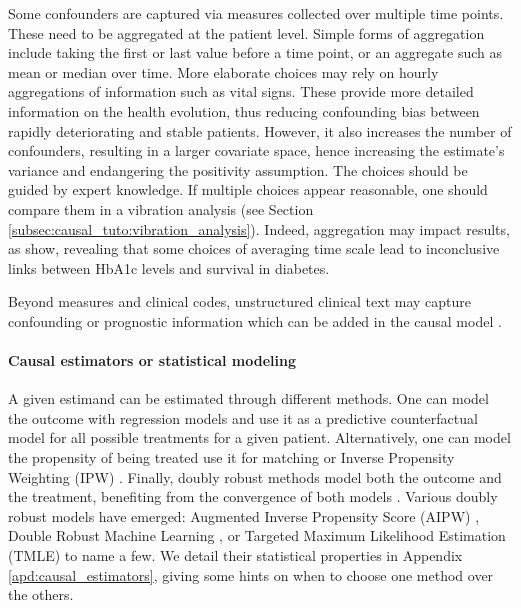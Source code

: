 \documentclass[french,12pt,twoside,a4paper]{book}
\begin{document}
Some confounders are captured via measures collected over multiple time points.
These need to be aggregated at the patient level. Simple forms of aggregation
include taking the first or last value before a time point, or an aggregate such
as mean or median over time. More elaborate choices may rely on hourly
aggregations of information such as vital signs. These provide more detailed
information on the health evolution, thus reducing confounding bias between
rapidly deteriorating and stable patients. However, it also increases the number
of confounders, resulting in a larger covariate space, hence increasing the
estimate's variance and endangering the positivity assumption. The choices
should be guided by expert knowledge. If multiple choices appear reasonable, one
should compare them in a vibration analysis (see Section
\ref{subsec:causal_tuto:vibration_analysis}). Indeed, aggregation may impact results, as
\cite{sofrygin2019targeted} show, revealing that some choices of averaging time
scale lead to inconclusive links between HbA1c levels and survival in diabetes.

Beyond measures and clinical codes, unstructured clinical text may capture
confounding or prognostic information \citep{horng2017creating,jiang2023health}
which can be added in the causal model \citep{zeng2022uncovering}.

\paragraph{Causal estimators or statistical modeling}

A given estimand can be estimated through different methods. One can model the
outcome with regression models \citep[also known as
  G-formula,][]{robins1986role} and use it as a predictive counterfactual model
for all possible treatments for a given patient. Alternatively, one can model
the propensity of being treated use it for matching or Inverse Propensity
Weighting (IPW) \citep{austin2015moving}. Finally, doubly robust methods model
both the outcome and the treatment, benefiting from the convergence of both
models \citep{wager2020stats}. Various doubly robust models have emerged:
Augmented Inverse Propensity Score (AIPW) \citep{robins1994estimation}, Double
Robust Machine Learning \citep{chernozhukov2018double}, or Targeted Maximum
Likelihood Estimation (TMLE) \citep{schuler2017targeted} to name a few. We
detail their statistical properties in Appendix \ref{apd:causal_estimators},
giving some hints on when to choose one method over the others.
\end{document}

